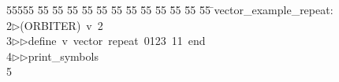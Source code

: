 %
%
\begin{tabbing}
55555 \= 55 \= 55 \= 55 \= 55 \= 55 \= 55 \= 55 \= 55 \= 55 \= 55 \= 55 \= 55 \= \>vector\_example\_repeat:\\[0pt]
2\>$\triangleright$\>(ORBITER)\ v\ 2\ \\[0pt]
3\>$\triangleright$\>$\triangleright$\>define\ v\ vector\ repeat\ 0123\ 11\ end\ \\[0pt]
4\>$\triangleright$\>$\triangleright$\>print\_symbols\\[0pt]
5\>\end{tabbing}
